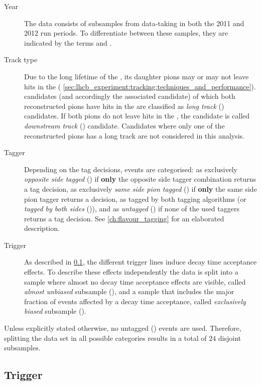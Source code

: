 \begin{description}
  \item[Year] The data consists of subsamples from data-taking in both the 2011
and 2012 run periods. To differentiate between these samples, they are indicated
by the terms \textbf{\catOO} and \textbf{\catOT}.

  \item[Track type] Due to the long lifetime of the \KS, its daughter pions may
or may not leave hits in the \VELO (\cf
\cref{sec:lhcb_experiment:tracking:techniques_and_performance}). \KS candidates
(and accordingly the associated \Bmeson candidate) of which both reconstructed
pions have hits in the \VELO are classified as \emph{long track}
(\textbf{\catLL}) candidates. If both pions do not leave hits in the \VELO, the
candidate is called \emph{downstream track} (\textbf{\catDD}) candidate.
Candidates where only one of the reconstructed pions has a long track are not
considered in this analysis.
  
  \item[Tagger] Depending on the tag decisions, events are categorised: as
  exclusively \emph{opposite side tagged} (\textbf{\catOS}) if \textbf{only} the
opposite side tagger combination returns a tag decision, as exclusively
\emph{same side pion tagged} (\textbf{\catSS}) if \textbf{only} the same side
pion tagger returns a decision, as tagged by both tagging algorithms (or
\emph{tagged by both sides} (\textbf{\catBS})), and as \emph{untagged}
(\textbf{\catUT}) if none of the used taggers returns a tag decision. See
\cref{ch:flavour_tagging} for an elaborated description.
  
  \item[Trigger] As described in
\cref{sec:measurement_of_sin2beta:data_preparation:trigger}, the different
trigger lines induce decay time acceptance effects. To describe these effects
independently the data is split into a sample where almost no decay time
acceptance effects are visible, called \emph{almost unbiased} subsample
(\textbf{\catAU}), and a sample that includes the major fraction of events
affected by a decay time acceptance, called \emph{exclusively biased} subsample
(\textbf{\catEB}).
\end{description}

Unless explicitly stated otherwise, no untagged (\textbf{\catUT}) events are
used. Therefore, splitting the data set in all possible categories results in a
total of $\num{24}$ disjoint subsamples.

\subsection{Trigger}
\label{sec:measurement_of_sin2beta:data_preparation:trigger}

